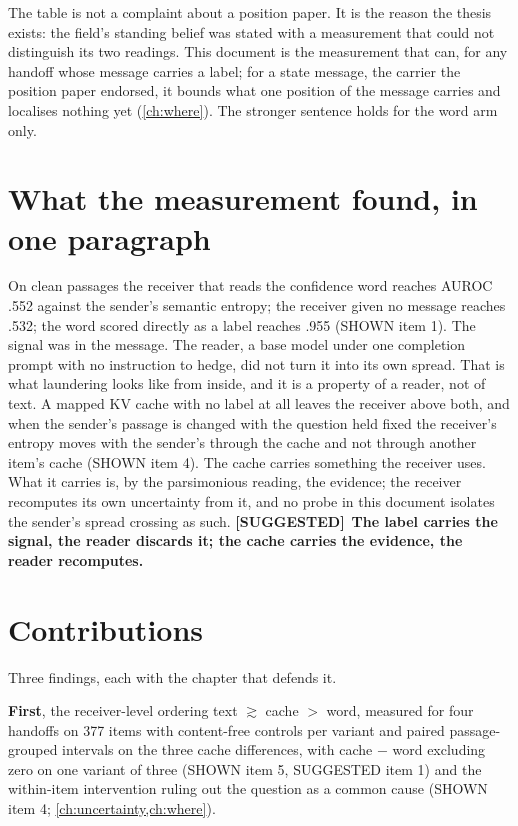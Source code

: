 \documentclass[11pt,a4paper]{report}
\newcommand{\SUGG}{\textcolor{suggc}{\textbf{\scriptsize[SUGGESTED]}}}
\begin{document}
The table is not a complaint about a position paper. It is the reason the thesis exists: the field's standing belief was stated with a measurement that could not distinguish its two readings. This document is the measurement that can, for any handoff whose message carries a label; for a state message, the carrier the position paper endorsed, it bounds what one position of the message carries and localises nothing yet (\cref{ch:where}). The stronger sentence holds for the word arm only.

\section{What the measurement found, in one paragraph}

On clean passages the receiver that reads the confidence word reaches AUROC .552 against the sender's semantic entropy; the receiver given no message reaches .532; the word scored directly as a label reaches .955 (SHOWN item 1). The signal was in the message. The reader, a base model under one completion prompt with no instruction to hedge, did not turn it into its own spread. That is what laundering looks like from inside, and it is a property of a reader, not of text. A mapped KV cache with no label at all leaves the receiver above both, and when the sender's passage is changed with the question held fixed the receiver's entropy moves with the sender's through the cache and not through another item's cache (SHOWN item 4). The cache carries something the receiver uses. What it carries is, by the parsimonious reading, the evidence; the receiver recomputes its own uncertainty from it, and no probe in this document isolates the sender's spread crossing as such. \SUGG\ \textbf{The label carries the signal, the reader discards it; the cache carries the evidence, the reader recomputes.}

\section{Contributions}

Three findings, each with the chapter that defends it.

\textbf{First}, the receiver-level ordering text $\gtrsim$ cache $>$ word, measured for four handoffs on 377 items with content-free controls per variant and paired passage-grouped intervals on the three cache differences, with cache $-$ word excluding zero on one variant of three (SHOWN item 5, SUGGESTED item 1) and the within-item intervention ruling out the question as a common cause (SHOWN item 4; \cref{ch:uncertainty,ch:where}).
\end{document}
